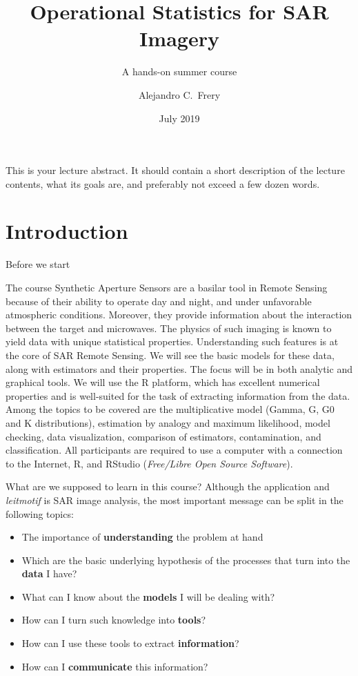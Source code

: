 \documentclass{beamer}
\title{Operational Statistics for SAR Imagery}
\subtitle{A hands-on summer course}
\date{July 2019}
\author{Alejandro C.\ Frery}
\institute{%
Laborat\'orio de Computa\c c\~ao Cient\'ifica e An\'alise Num\'erica\\
Universidade Federal de Alagoas
}
\begin{document}
\maketitle

\mode*  %

This is your lecture abstract. It should contain a short description of the lecture contents, what its goals are, and preferably not exceed a few dozen words.

\section{Introduction}

\begin{frame}{Before we start}
\begin{alertblock}{The course}
{\scriptsize Synthetic Aperture Sensors are a basilar tool in Remote Sensing because of their ability to operate day and night, and under unfavorable atmospheric conditions. Moreover, they provide information about the interaction between the target and microwaves. The physics of such imaging is known to yield data with unique statistical properties. Understanding such features is at the core of SAR Remote Sensing. We will see the basic models for these data, along with estimators and their properties. The focus will be in both analytic and graphical tools. We will use the R platform, which has excellent numerical properties and is well-suited for the task of extracting information from the data. Among the topics to be covered are the multiplicative model (Gamma, G, G0 and K distributions), estimation by analogy and maximum likelihood, model checking, data visualization, comparison of estimators, contamination, and classification. All participants are required to use a computer with a connection to the Internet, R, and RStudio (\textit{Free/Libre Open Source Software}).}
\end{alertblock}
\end{frame}

\begin{frame}{What are we supposed to learn in this course?}
Although the application and \textit{leitmotif} is SAR image analysis, the most important message can be split in the following topics:
\begin{itemize}
\item The importance of \textbf{understanding} the problem at hand
\item Which are the basic underlying hypothesis of the processes that turn into the \textbf{data} I have?
\item What can I know about the \textbf{models} I will be dealing with?
\item How can I turn such knowledge into \textbf{tools}?
\item How can I use these tools to extract \textbf{information}?
\item How can I \textbf{communicate} this information?
\end{itemize}
\end{frame}
\end{document}
